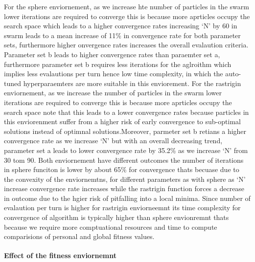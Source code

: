 \documentclass[
]{article}
\begin{document}
For the sphere enviornement, as we increase hte number of particles in
the swarm lower iterations are required to converge this is because more
aprticles occupy the search space which leads to a higher convergence
rates increasing `N' by 60 in swarm leads to a mean increase of 11\% in
convergence rate for both parameter sets, furthermore higher onvergence
rates increases the overall evalaution criteria. Parameter set b leads
to higher convergence rates than paraemter set a, furthermore parameter
set b requires less iterations for the aglroithm which implies less
evalautions per turn hence low time complexity, in which the auto-tuned
hyperparaemters are more suitable in this enviorement. For the rastrigin
enviornement, as we increase the number of particles in the swarm lower
iterations are required to converge this is because more aprticles
occupy the search space note that this leads to a lower convergence
rates because particles in this enviorenment suffer from a higher risk
of early convergence to sub-optimal solutions instead of optimnal
solutions.Moreover, parmeter set b retians a higher convergence rate as
we increase `N' but with an overall decreasing trend, parameter set a
leads to lower convergence rate by 35.2\% as we increase `N' from 30 tom
90. Both enviornement have different outcomes the number of iterations
in sphere funciton is lower by about 65\% for convergence thats becuase
due to the convexity of the enviornemtns, for different parameters as
with sphere as `N' increase convergence rate increases while the
rastrigin function forces a decrease in outcome due to the hgier risk of
pitfalling into a local minima. Since number of evalaution per turn is
higher for rastrigin enviorneemnt its time complexity for convergence of
algorithm is typically higher than sphere envionremnt thats because we
require more comptuational resources and time to compute comparisions of
personal and global fitness values.

\hypertarget{effect-of-the-fitness-enviornemnt}{%
\paragraph{Effect of the fitness
enviornemnt}\label{effect-of-the-fitness-enviornemnt}}

\begin{table}[H]
\centering
{}
\end{table}
\end{document}
